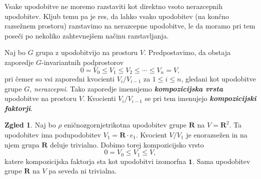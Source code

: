 \documentclass[11pt]{book}
\def\RR{\mathbf{R}}
\def\11{\mathbf{1}}
\def\definicija{\color{rdeca}\bf\em}
\theoremstyle{definition}
\theoremstyle{zgled}
\newtheorem*{zgled}{Zgled}
\theoremstyle{odprtproblem}
\theoremstyle{domacanaloga}
\theoremstyle{izrek}
\begin{document}
Vsake upodobitve ne moremo razstaviti kot direktno vsoto nerazcepnih upodobitev. Kljub temu pa je res, da lahko vsako upodobitev (na končno razsežnem prostoru) razstavimo na nerazcepne upodobitve, le da moramo pri tem poseči po nekoliko zahtevnejšem načinu razstavljanja.

Naj bo $G$ grupa z upodobitvijo na prostoru $V$. Predpostavimo, da obstaja zaporedje $G$-invariantnih podprostorov
\[
    0 = V_0 \leq V_1 \leq V_2 \leq \cdots \leq V_n = V,
\]
pri čemer so vsi zaporedni kvocienti $V_i/V_{i-1}$ za $1 \leq i \leq n$, gledani kot upodobitve grupe $G$, \emph{nerazcepni}. Tako zaporedje imenujemo {\definicija kompozicijska vrsta} upodobitve na prostoru $V$. Kvocienti $V_i/V_{i-1}$ se pri tem imenujejo {\definicija kompozicijski faktorji}.

\begin{zgled}
Naj bo $\rho$ eničnozgornjetrikotna upodobitev grupe $\RR$ na $V = \RR^2$. Ta upodobitev ima podupodobitev $V_1 = \RR \cdot e_1$. Kvocient $V/V_1$ je enorazsežen in na njem grupa $\RR$ deluje trivialno. Dobimo torej kompozicijsko vrsto
\[
    0 = V_0 \leq V_1 \leq V,
\]
katere kompozicijska faktorja sta kot upodobitvi izomorfna $\11$. Sama upodobitev grupe $\RR$ na $V$ pa seveda ni trivialna.
\end{zgled}
\end{document}
